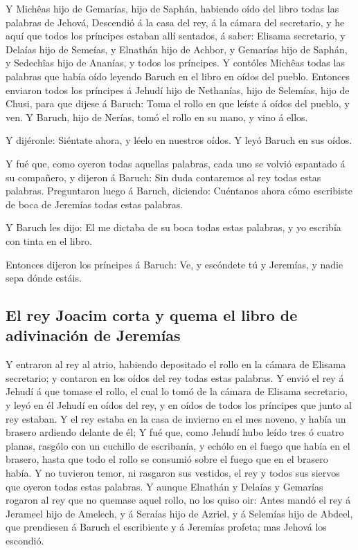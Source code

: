  Y Michêas hijo de Gemarías, hijo de Saphán, habiendo oído
del libro todas las palabras de Jehová,  Descendió á la
casa del rey, á la cámara del secretario, y he aquí que todos los
príncipes estaban allí sentados, á saber: Elisama secretario, y Delaías
hijo de Semeías, y Elnathán hijo de Achbor, y Gemarías hijo de Saphán, y
Sedechîas hijo de Ananías, y todos los príncipes.  Y
contóles Michêas todas las palabras que había oído leyendo Baruch en el
libro en oídos del pueblo.  Entonces enviaron todos los
príncipes á Jehudí hijo de Nethanías, hijo de Selemías, hijo de Chusi,
para que dijese á Baruch: Toma el rollo en que leíste á oídos del
pueblo, y ven. Y Baruch, hijo de Nerías, tomó el rollo en su mano, y
vino á ellos.

 Y dijéronle: Siéntate ahora, y léelo en nuestros oídos. Y
leyó Baruch en sus oídos.

 Y fué que, como oyeron todas aquellas palabras, cada uno
se volvió espantado á su compañero, y dijeron á Baruch: Sin duda
contaremos al rey todas estas palabras.  Preguntaron luego
á Baruch, diciendo: Cuéntanos ahora cómo escribiste de boca de Jeremías
todas estas palabras.

 Y Baruch les dijo: El me dictaba de su boca todas estas
palabras, y yo escribía con tinta en el libro.

 Entonces dijeron los príncipes á Baruch: Ve, y escóndete
tú y Jeremías, y nadie sepa dónde estáis.

\hypertarget{el-rey-joacim-corta-y-quema-el-libro-de-adivinaciuxf3n-de-jeremuxedas}{%
\subsection{El rey Joacim corta y quema el libro de adivinación de
Jeremías}\label{el-rey-joacim-corta-y-quema-el-libro-de-adivinaciuxf3n-de-jeremuxedas}}

 Y entraron al rey al atrio, habiendo depositado el rollo
en la cámara de Elisama secretario; y contaron en los oídos del rey
todas estas palabras.  Y envió el rey á Jehudí á que tomase
el rollo, el cual lo tomó de la cámara de Elisama secretario, y leyó en
él Jehudí en oídos del rey, y en oídos de todos los príncipes que junto
al rey estaban.  Y el rey estaba en la casa de invierno en
el mes noveno, y había un brasero ardiendo delante de él; 
Y fué que, como Jehudí hubo leído tres ó cuatro planas, rasgólo con un
cuchillo de escribanía, y echólo en el fuego que había en el brasero,
hasta que todo el rollo se consumió sobre el fuego que en el brasero
había.  Y no tuvieron temor, ni rasgaron sus vestidos, el
rey y todos sus siervos que oyeron todas estas palabras.  Y
aunque Elnathán y Delaías y Gemarías rogaron al rey que no quemase aquel
rollo, no los quiso oir:  Antes mandó el rey á Jerameel
hijo de Amelech, y á Seraías hijo de Azriel, y á Selemías hijo de
Abdeel, que prendiesen á Baruch el escribiente y á Jeremías profeta; mas
Jehová los escondió.

